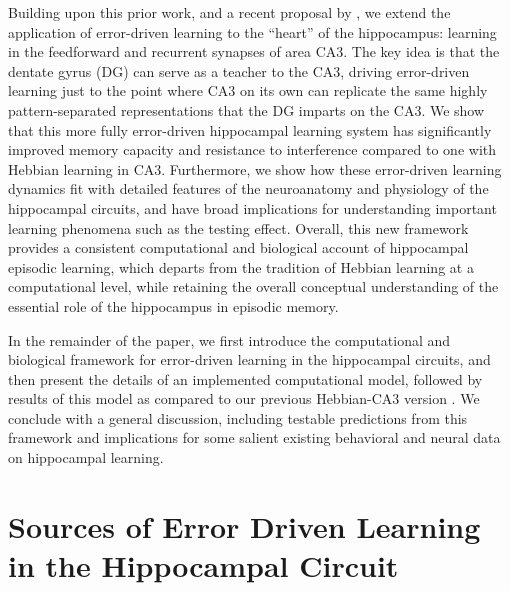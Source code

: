 \documentclass[11pt,twoside]{article}
\newif\myifpdf
\begin{document}
Building upon this prior work, and a recent proposal by \citet{KowadloAhmedRawlinson20}, we extend the application of error-driven learning to the ``heart'' of the hippocampus: learning in the feedforward and recurrent synapses of area CA3.  The key idea is that the dentate gyrus (DG) can serve as a teacher to the CA3, driving error-driven learning just to the point where CA3 on its own can replicate the same highly pattern-separated representations that the DG imparts on the CA3.  We show that this more fully error-driven hippocampal learning system has significantly improved memory capacity and resistance to interference compared to one with Hebbian learning in CA3.  Furthermore, we show how these error-driven learning dynamics fit with detailed features of the neuroanatomy and physiology of the hippocampal circuits, and have broad implications for understanding important learning phenomena such as the testing effect.  Overall, this new framework provides a consistent computational and biological account of hippocampal episodic learning, which departs from the tradition of Hebbian learning at a computational level, while retaining the overall conceptual understanding of the essential role of the hippocampus in episodic memory.

In the remainder of the paper, we first introduce the computational and biological framework for error-driven learning in the hippocampal circuits, and then present the details of an implemented computational model, followed by results of this model as compared to our previous Hebbian-CA3 version \citep{KetzMorkondaOReilly13}.  We conclude with a general discussion, including testable predictions from this framework and implications for some salient existing behavioral and neural data on hippocampal learning.

\section{Sources of Error Driven Learning in the Hippocampal Circuit}
\end{document}
